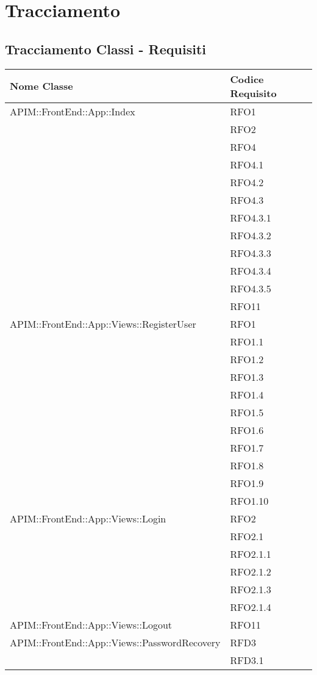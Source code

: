 \newpage
\renewcommand*{\arraystretch}{1.6}

\section{Tracciamento}

\subsection{Tracciamento Classi - Requisiti}
\normalsize
\begin{longtable}{ p{12cm} | p{4cm} }
	\hline \rowcolor{Gray}
	\textbf{Nome Classe} & \textbf{Codice Requisito} \\
	\hline
	APIM::FrontEnd::App::Index
	& RFO1 \\
	& RFO2 \\
	& RFO4 \\
	& RFO4.1 \\
	& RFO4.2 \\
	& RFO4.3 \\
	& RFO4.3.1 \\
	& RFO4.3.2 \\
	& RFO4.3.3 \\
	& RFO4.3.4 \\
	& RFO4.3.5 \\
	& RFO11 \\
	\hline
	APIM::FrontEnd::App::Views::RegisterUser
	& RFO1 \\
	& RFO1.1 \\
	& RFO1.2 \\
	& RFO1.3 \\
	& RFO1.4 \\
	& RFO1.5 \\
	& RFO1.6 \\
	& RFO1.7 \\
	& RFO1.8 \\
	& RFO1.9 \\
	& RFO1.10 \\
	\hline
	APIM::FrontEnd::App::Views::Login
	& RFO2 \\
	& RFO2.1 \\
	& RFO2.1.1 \\
	& RFO2.1.2 \\
	& RFO2.1.3 \\
	& RFO2.1.4 \\
	\hline
	APIM::FrontEnd::App::Views::Logout
	& RFO11 \\
	\hline
	APIM::FrontEnd::App::Views::PasswordRecovery
	& RFD3 \\
	& RFD3.1 \\

\end{longtable}
